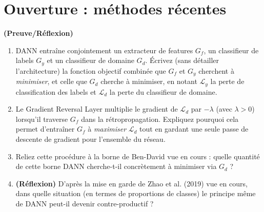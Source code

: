 \documentclass[11pt]{article}
\begin{document}
\section{Ouverture : méthodes récentes}

\begin{exercise} \textbf{(Preuve/Réflexion)}
\begin{enumerate}[label=(\alph*)]
\item DANN entraîne conjointement un extracteur de features $G_f$, un classifieur de labels $G_y$ et un
classifieur de domaine $G_d$. Écrivez (sans détailler l'architecture) la fonction objectif combinée que
$G_f$ et $G_y$ cherchent à \emph{minimiser}, et celle que $G_d$ cherche à minimiser, en notant
$\mathcal L_y$ la perte de classification des labels et $\mathcal L_d$ la perte du classifieur de domaine.
\item Le Gradient Reversal Layer multiplie le gradient de $\mathcal L_d$ par $-\lambda$ (avec
$\lambda > 0$) lorsqu'il traverse $G_f$ dans la rétropropagation. Expliquez pourquoi cela permet
d'entraîner $G_f$ à \emph{maximiser} $\mathcal L_d$ tout en gardant une seule passe de descente de
gradient pour l'ensemble du réseau.
\item Reliez cette procédure à la borne de Ben-David vue en cours : quelle quantité de cette borne DANN
cherche-t-il concrètement à minimiser via $G_d$ ?
\item \textbf{(Réflexion)} D'après la mise en garde de Zhao et al. (2019) vue en cours, dans quelle
situation (en termes de proportions de classes) le principe même de DANN peut-il devenir contre-productif ?
\end{enumerate}
\end{exercise}
\end{document}
